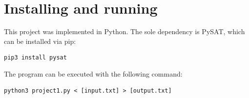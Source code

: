 \documentclass[sigconf, 10pt]{acmart}
\begin{document}
\section{Installing and running}
This project was implemented in Python. The sole dependency is PySAT, which can be installed via pip:
\begin{verbatim}
pip3 install pysat
\end{verbatim}
The program can be executed with the following command:
\begin{verbatim}
python3 project1.py < [input.txt] > [output.txt]
\end{verbatim}




\newpage
\end{document}
